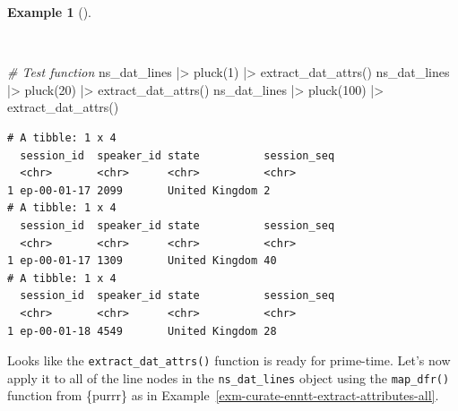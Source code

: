 \documentclass[
  letterpaper,
  krantz1]{latex/krantz-mod}
\newenvironment{Shaded}{\begin{snugshade}}{\end{snugshade}}
\newcommand{\CommentTok}[1]{\textcolor[rgb]{0.00,0.00,0.00}{\textit{#1}}}
\newcommand{\DecValTok}[1]{\textcolor[rgb]{0.00,0.00,0.00}{#1}}
\newcommand{\FunctionTok}[1]{\textcolor[rgb]{0.00,0.00,0.00}{#1}}
\newcommand{\NormalTok}[1]{\textcolor[rgb]{0.00,0.00,0.00}{#1}}
\newcommand{\SpecialCharTok}[1]{\textcolor[rgb]{0.00,0.00,0.00}{#1}}
\theoremstyle{definition}
\newtheorem{example}{Example}[chapter]
\theoremstyle{definition}
\theoremstyle{remark}
\begin{document}
\begin{example}[]\protect\hypertarget{exm-curate-enntt-test-extract-attributes-function}{}\label{exm-curate-enntt-test-extract-attributes-function}

~

\begin{Shaded}
\begin{Highlighting}[numbers=left,,]
\CommentTok{\# Test function}
\NormalTok{ns\_dat\_lines }\SpecialCharTok{|\textgreater{}} \FunctionTok{pluck}\NormalTok{(}\DecValTok{1}\NormalTok{) }\SpecialCharTok{|\textgreater{}} \FunctionTok{extract\_dat\_attrs}\NormalTok{()}
\NormalTok{ns\_dat\_lines }\SpecialCharTok{|\textgreater{}} \FunctionTok{pluck}\NormalTok{(}\DecValTok{20}\NormalTok{) }\SpecialCharTok{|\textgreater{}} \FunctionTok{extract\_dat\_attrs}\NormalTok{()}
\NormalTok{ns\_dat\_lines }\SpecialCharTok{|\textgreater{}} \FunctionTok{pluck}\NormalTok{(}\DecValTok{100}\NormalTok{) }\SpecialCharTok{|\textgreater{}} \FunctionTok{extract\_dat\_attrs}\NormalTok{()}
\end{Highlighting}
\end{Shaded}

\begin{verbatim}
# A tibble: 1 x 4
  session_id  speaker_id state          session_seq
  <chr>       <chr>      <chr>          <chr>      
1 ep-00-01-17 2099       United Kingdom 2          
# A tibble: 1 x 4
  session_id  speaker_id state          session_seq
  <chr>       <chr>      <chr>          <chr>      
1 ep-00-01-17 1309       United Kingdom 40         
# A tibble: 1 x 4
  session_id  speaker_id state          session_seq
  <chr>       <chr>      <chr>          <chr>      
1 ep-00-01-18 4549       United Kingdom 28         
\end{verbatim}

\end{example}

Looks like the \texttt{extract\_dat\_attrs()} function is ready for
prime-time. Let's now apply it to all of the line nodes in the
\texttt{ns\_dat\_lines} object using the \texttt{map\_dfr()} function
from \{purrr\} as in
Example~\ref{exm-curate-enntt-extract-attributes-all}.
\end{document}

